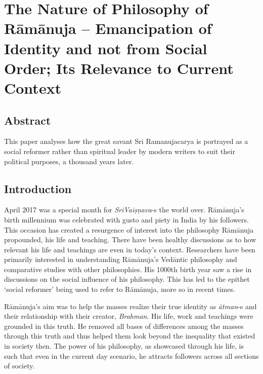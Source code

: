 
\chapter{The Nature of Philosophy of Rāmānuja – Emancipation of Identity and not from Social Order; Its Relevance to Current Context}\label{chapter8}



\section*{Abstract}

This paper analyses how the great savant Sri Ramanujacarya is portrayed as a social reformer rather than spiritual leader by modern writers to suit their political purposes, a thousand years later.


\section*{Introduction}

April 2017 was a special month for \textit{SriVaiṣņava}-s the world over. Rāmānuja’s birth millennium was celebrated with gusto and piety in India by his followers. This occasion has created a resurgence of interest into the philosophy Rāmānuja propounded, his life and teaching. There have been healthy discussions as to how relevant his life and teachings are even in today’s context. Researchers have been primarily interested in understanding Rāmānuja’s Vedāntic philosophy and comparative studies with other philosophies. His 1000th birth year saw a rise in discussions on the social influence of his philosophy. This has led to the epithet ‘social reformer’ being used to refer to Rāmānuja, more so in recent times.

Rāmānuja’s aim was to help the masses realize their true identity as \textit{ātman}-s and their relationship with their creator, \textit{Brahman}. His life, work and teachings were grounded in this truth. He removed all bases of differences among the masses through this truth and thus helped them look beyond the inequality that existed in society then. The power of his philosophy, as showcased through his life, is such that even in the current day scenario, he attracts followers across all sections of society.

